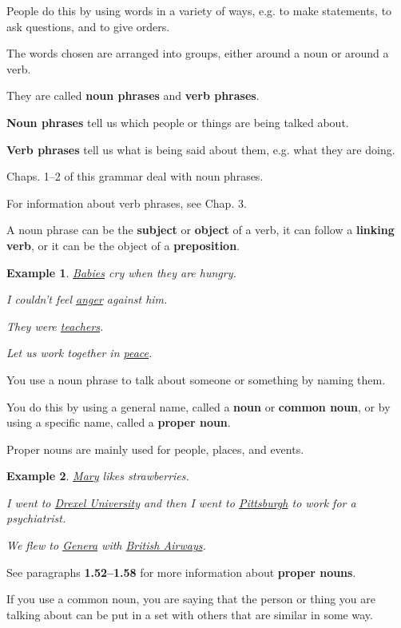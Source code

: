 \documentclass[oneside]{book}
\numberwithin{equation}{section}
\newtheorem{example}{Example}[section]
\begin{document}
People do this by using words in a variety of ways, e.g. to make statements, to ask questions, and to give orders.

The words chosen are arranged into groups, either around a noun or around a verb.

They are called \textbf{noun phrases} and \textbf{verb phrases}.

%
\textbf{Noun phrases} tell us which people or things are being talked about.

\textbf{Verb phrases} tell us what is being said about them, e.g. what they are doing.

%
Chaps. 1--2 of this grammar deal with noun phrases.

For information about verb phrases, see Chap. 3.

%
\noindent{} A noun phrase can be the \textbf{subject} or \textbf{object} of a verb, it can follow a \textbf{linking verb}, or it can be the object of a \textbf{preposition}.
\begin{example}
    \underline{Babies} cry when they are hungry.
    
    I couldn't feel \underline{anger} against him.
    
    They were \underline{teachers}.
    
    Let us work together in \underline{peace}.
\end{example}
%
\noindent{} You use a noun phrase to talk about someone or something by naming them.

You do this by using a general name, called a \textbf{noun} or \textbf{common noun}, or by using a specific name, called a \textbf{proper noun}.

%
Proper nouns are mainly used for people, places, and events.
\begin{example}
    \underline{Mary} likes strawberries.
    
    I went to \underline{Drexel University} and then I went to \underline{Pittsburgh} to work for a psychiatrist.
    
    We flew to \underline{Genera} with \underline{British Airways}.
\end{example}
See paragraphs \textbf{1.52--1.58} for more information about \textbf{proper nouns}.

%
\noindent{} If you use a common noun, you are saying that the person or thing you are talking about can be put in a set with others that are similar in some way.
\end{document}
